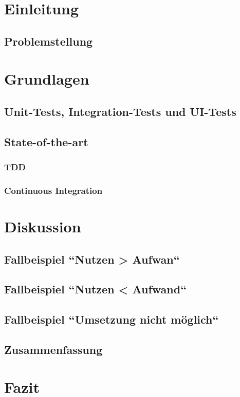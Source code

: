 \chapter{Einleitung}
\section{Problemstellung}
\chapter{Grundlagen}
\section{Unit-Tests, Integration-Tests und UI-Tests}
\section{State-of-the-art}
\subsection{TDD}
\subsection{Continuous Integration}
\chapter{Diskussion}
\section{Fallbeispiel ``Nutzen > Aufwan``}
\section{Fallbeispiel ``Nutzen < Aufwand``}
\section{Fallbeispiel ``Umsetzung nicht möglich``}
\section{Zusammenfassung}
\chapter{Fazit}